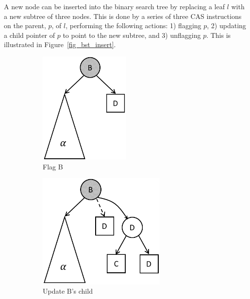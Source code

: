 \documentclass[letterpaper]{article}
\begin{document}
A new node can be inserted into the binary search tree by replacing a leaf $l$ with a new subtree of three nodes. This is done by a series of three CAS instructions on the parent, $p$, of $l$, performing the following actions: 1) flagging $p$, 2) updating a child pointer of $p$ to point to the new subtree, and 3) unflagging $p$. This is illustrated in Figure~\ref{fig_bst_insert}. 

\begin{figure}[!bt]
	\centering
	\begin{subfigure}[b]{0.3\textwidth}\centering
		\includegraphics[width=0.5\textwidth]{bst_ins_2.png} %
		\caption{Flag B}
	\end{subfigure}
	\quad
	\begin{subfigure}[b]{0.3\textwidth}\centering
		\includegraphics[width=0.7\textwidth]{bst_ins_3.png} %
		\caption{Update B's child}
	\end{subfigure}
	\quad
	\begin{subfigure}[b]{0.3\textwidth}\centering

\end{subfigure}
\end{figure}
\end{document}

